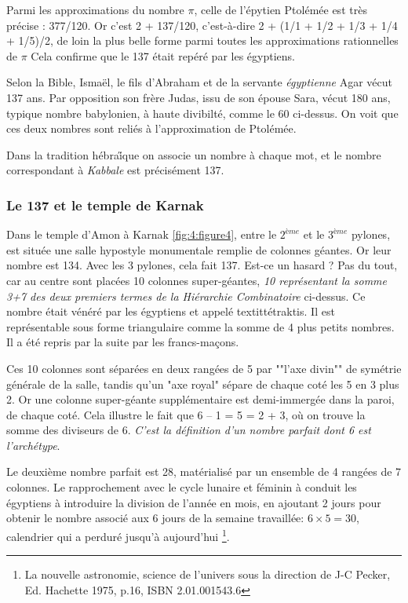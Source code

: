 \documentclass[a4paper,12pt]{article}
\begin{document}
      Parmi les approximations du nombre $\pi$, celle de l'épytien Ptolémée est très précise : 377/120. Or c'est 2 + 137/120, c'est-à-dire 2 + (1/1 + 1/2 + 1/3 + 1/4 + 1/5)/2, de loin la plus belle forme parmi toutes les approximations rationnelles de $\pi$  Cela confirme que le 137 était repéré par les égyptiens. 
      
      
      Selon la Bible, Ismaël, le fils d'Abraham et de la servante \textit{égyptienne} Agar vécut 137 ans.  Par opposition son frère Judas, issu de son épouse Sara, vécut 180 ans, typique nombre babylonien, à haute divibilté, comme le 60 ci-dessus. On voit que ces deux nombres sont reliés à l'approximation de Ptolémée. 
      
      
      Dans la tradition hébra\H ique on associe un nombre à chaque mot, et le nombre correspondant à \textit{Kabbale} est précisément 137.


\subsubsection{ Le 137 et le temple de Karnak}

     Dans le temple d'Amon à Karnak \ref{fig:4:figure4}, entre le $2^{ème}$ et le $3^{ème}$ pylones, est située une salle hypostyle monumentale remplie de colonnes géantes. Or leur nombre est 134. Avec les 3 pylones, cela fait 137. Est-ce un hasard  ? Pas du tout, car au centre sont placées 10 colonnes super-géantes, \textit{10 représentant la somme 3+7 des deux premiers termes de la Hiérarchie Combinatoire} ci-dessus. Ce nombre était vénéré par les égyptiens et appelé textit{tétraktis}. Il est représentable sous forme triangulaire comme la somme de 4 plus petits nombres. Il a été repris par la suite par les francs-maçons.


Ces 10 colonnes sont séparées en deux rangées de 5 par ""l'axe divin"" de symétrie générale de la salle, tandis qu'un "axe royal" sépare de chaque coté les 5 en 3 plus 2.  Or une colonne super-géante supplémentaire est demi-immergée dans la paroi, de chaque coté. Cela illustre le fait que 6 – 1 = 5 = 2 + 3, où on trouve la somme des diviseurs de 6. \textit{C'est la définition d'un nombre parfait dont 6 est l'archétype}.


      Le deuxième nombre parfait est 28, matérialisé par un ensemble de 4 rangées de 7 colonnes. Le rapprochement avec le cycle lunaire et féminin à conduit les égyptiens à introduire la division de l'année en mois, en ajoutant 2 jours pour obtenir le nombre associé aux 6 jours de la semaine travaillée: $6 \times 5 = 30$, calendrier qui a perduré jusqu'à aujourd'hui \footnote{La nouvelle astronomie, science de l'univers sous la direction de J-C Pecker, Ed. Hachette 1975, p.16, ISBN 2.01.001543.6}. 
      
\end{document}
